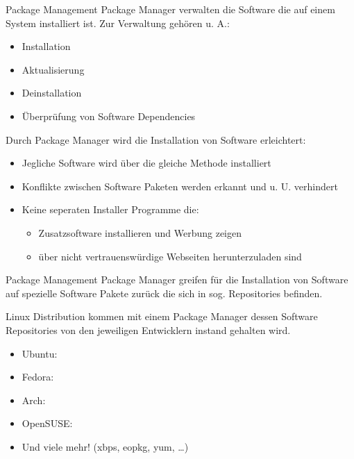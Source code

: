 \documentclass{setbeamer}
\begin{document}
\begin{frame}{Package Management}
    Package Manager verwalten die Software die auf einem System installiert ist. Zur Verwaltung gehören u. A.:
    \begin{itemize}
        \item Installation
        \item Aktualisierung
        \item Deinstallation
        \item Überprüfung von Software Dependencies
    \end{itemize}

    \pause
    \vspace{0.3cm}

    Durch Package Manager wird die Installation von Software erleichtert:
    \begin{itemize}
        \item Jegliche Software wird über die gleiche Methode installiert
        \item Konflikte zwischen Software Paketen werden erkannt und u. U. verhindert
        \item Keine seperaten Installer Programme die:
        \begin{itemize}
            \item Zusatzsoftware installieren und Werbung zeigen
            \item über nicht vertrauenswürdige Webseiten herunterzuladen sind
        \end{itemize}
    \end{itemize}
\end{frame}

\begin{frame}{Package Management}
    Package Manager greifen für die Installation von Software auf spezielle Software Pakete zurück die sich in sog. Repositories befinden.

    \vspace{0.3cm}

    Linux Distribution kommen mit einem Package Manager dessen Software Repositories von den jeweiligen Entwicklern instand gehalten wird.
    \begin{itemize}
        \item Ubuntu: 
        \item Fedora: 
        \item Arch: 
        \item OpenSUSE: 
        \item Und viele mehr! (xbps, eopkg, yum, \dots)
    \end{itemize}
\end{frame}
\end{document}
